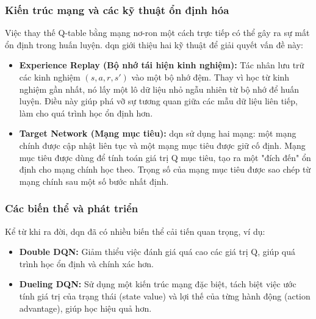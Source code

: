 \subsubsection{Kiến trúc mạng và các kỹ thuật ổn định hóa}
Việc thay thế Q-table bằng mạng nơ-ron một cách trực tiếp có thể gây ra sự mất
ổn định trong huấn luyện. \ac{dqn} giới thiệu hai kỹ thuật để giải quyết
vấn đề này:
\begin{itemize}
    \item \textbf{Experience Replay (Bộ nhớ tái hiện kinh nghiệm):} Tác nhân lưu
        trữ các kinh nghiệm $(s, a, r, s')$ vào một bộ nhớ đệm. Thay vì học từ kinh
        nghiệm gần nhất, nó lấy một lô dữ liệu nhỏ ngẫu nhiên từ bộ nhớ để huấn
        luyện. Điều này giúp phá vỡ sự tương quan giữa các mẫu dữ liệu liên tiếp,
        làm cho quá trình học ổn định hơn.

    \item \textbf{Target Network (Mạng mục tiêu):} \ac{dqn} sử dụng hai mạng:
        một mạng chính được cập nhật liên tục và một mạng mục tiêu được giữ cố
        định. Mạng mục tiêu được dùng để tính toán giá trị Q mục tiêu, tạo ra
        một "đích đến" ổn định cho mạng chính học theo. Trọng số của mạng mục tiêu
        được sao chép từ mạng chính sau một số bước nhất định.
\end{itemize}

\subsubsection{Các biến thể và phát triển}
Kể từ khi ra đời, \ac{dqn} đã có nhiều biến thể cải tiến quan trọng, ví dụ:
\begin{itemize}
    \item \textbf{Double DQN:} Giảm thiểu việc đánh giá quá cao các giá trị Q, giúp
        quá trình học ổn định và chính xác hơn.

    \item \textbf{Dueling DQN:} Sử dụng một kiến trúc mạng đặc biệt, tách biệt việc
        ước tính giá trị của trạng thái (state value) và lợi thế của từng hành động
        (action advantage), giúp học hiệu quả hơn.
\end{itemize}


